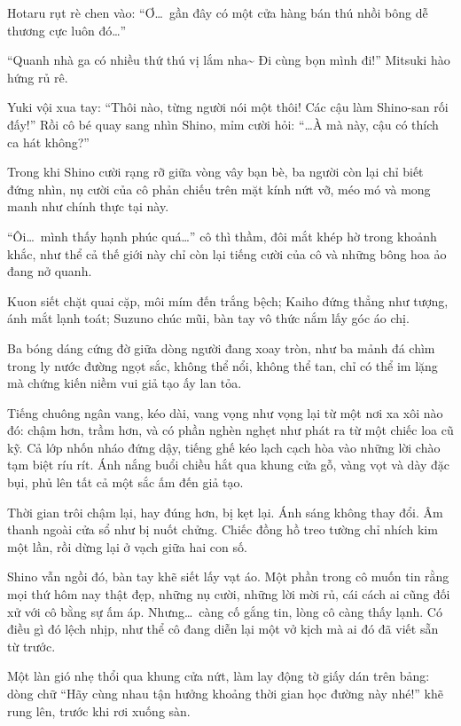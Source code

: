 \documentclass[../main.tex]{subfiles}
\begin{document}
Hotaru rụt rè chen vào: ``Ơ\dots\ gần đây có một cửa hàng bán thú nhồi bông dễ thương cực luôn đó\dots''

``Quanh nhà ga có nhiều thứ thú vị lắm nha\~{} Đi cùng bọn mình đi!'' Mitsuki hào hứng rủ rê.

Yuki vội xua tay: ``Thôi nào, từng người nói một thôi! Các cậu làm Shino-san rối đấy!'' Rồi cô bé quay sang nhìn Shino, mỉm cười hỏi: ``\dots À mà này, cậu có thích ca hát không?''


Trong khi Shino cười rạng rỡ giữa vòng vây bạn bè, ba người còn lại chỉ biết đứng nhìn, nụ cười của cô phản chiếu trên mặt kính nứt vỡ, méo mó và mong manh như chính thực tại này.

``Ôi\dots\ mình thấy hạnh phúc quá\dots'' cô thì thầm, đôi mắt khép hờ trong khoảnh khắc, như thể cả thế giới này chỉ còn lại tiếng cười của cô và những bông hoa ảo đang nở quanh.

Kuon siết chặt quai cặp, môi mím đến trắng bệch; Kaiho đứng thẳng như tượng, ánh mắt lạnh toát; Suzuno chúc mũi, bàn tay vô thức nắm lấy góc áo chị.

Ba bóng dáng cứng đờ giữa dòng người đang xoay tròn, như ba mảnh đá chìm trong ly nước đường ngọt sắc, không thể nổi, không thể tan, chỉ có thể im lặng mà chứng kiến niềm vui giả tạo ấy lan tỏa.

Tiếng chuông ngân vang, kéo dài, vang vọng như vọng lại từ một nơi xa xôi nào đó: chậm hơn, trầm hơn, và có phần nghèn nghẹt như phát ra từ một chiếc loa cũ kỹ. Cả lớp nhốn nháo đứng dậy, tiếng ghế kéo lạch cạch hòa vào những lời chào tạm biệt ríu rít. Ánh nắng buổi chiều hắt qua khung cửa gỗ, vàng vọt và dày đặc bụi, phủ lên tất cả một sắc ấm đến giả tạo.

Thời gian trôi chậm lại, hay đúng hơn, bị kẹt lại. Ánh sáng không thay đổi. Âm thanh ngoài cửa sổ như bị nuốt chửng. Chiếc đồng hồ treo tường chỉ nhích kim một lần, rồi dừng lại ở vạch giữa hai con số.

Shino vẫn ngồi đó, bàn tay khẽ siết lấy vạt áo. Một phần trong cô muốn tin rằng mọi thứ hôm nay thật đẹp, những nụ cười, những lời mời rủ, cái cách ai cũng đối xử với cô bằng sự ấm áp. Nhưng\dots\ càng cố gắng tin, lòng cô càng thấy lạnh. Có điều gì đó lệch nhịp, như thể cô đang diễn lại một vở kịch mà ai đó đã viết sẵn từ trước.

Một làn gió nhẹ thổi qua khung cửa nứt, làm lay động tờ giấy dán trên bảng: dòng chữ ``Hãy cùng nhau tận hưởng khoảng thời gian học đường này nhé!'' khẽ rung lên, trước khi rơi xuống sàn.
\end{document}
